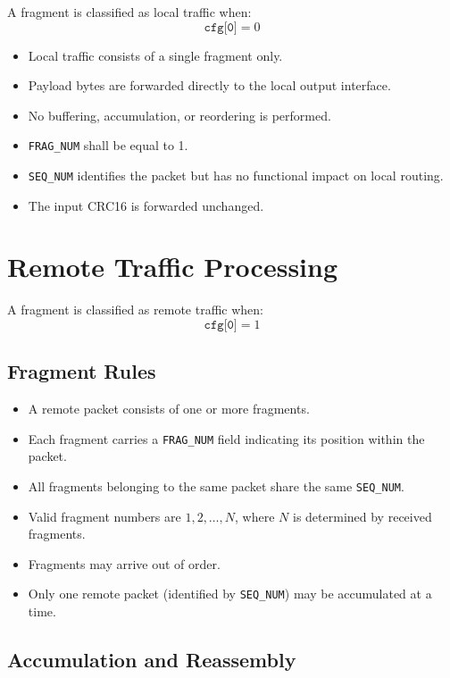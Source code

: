 \documentclass[11pt,a4paper]{article}
\begin{document}
A fragment is classified as local traffic when:
\[
\texttt{cfg[0]} = 0
\]

\begin{itemize}
  \item Local traffic consists of a single fragment only.
  \item Payload bytes are forwarded directly to the local output interface.
  \item No buffering, accumulation, or reordering is performed.
  \item \texttt{FRAG\_NUM} shall be equal to 1.
  \item \texttt{SEQ\_NUM} identifies the packet but has no functional impact on local routing.
  \item The input CRC16 is forwarded unchanged.
\end{itemize}

\section{Remote Traffic Processing}

A fragment is classified as remote traffic when:
\[
\texttt{cfg[0]} = 1
\]

\subsection{Fragment Rules}

\begin{itemize}
  \item A remote packet consists of one or more fragments.
  \item Each fragment carries a \texttt{FRAG\_NUM} field indicating its position within the packet.
  \item All fragments belonging to the same packet share the same \texttt{SEQ\_NUM}.
  \item Valid fragment numbers are $1,2,\dots,N$, where $N$ is determined by received fragments.
  \item Fragments may arrive out of order.
  \item Only one remote packet (identified by \texttt{SEQ\_NUM}) may be accumulated at a time.
\end{itemize}

\subsection{Accumulation and Reassembly}
\end{document}
